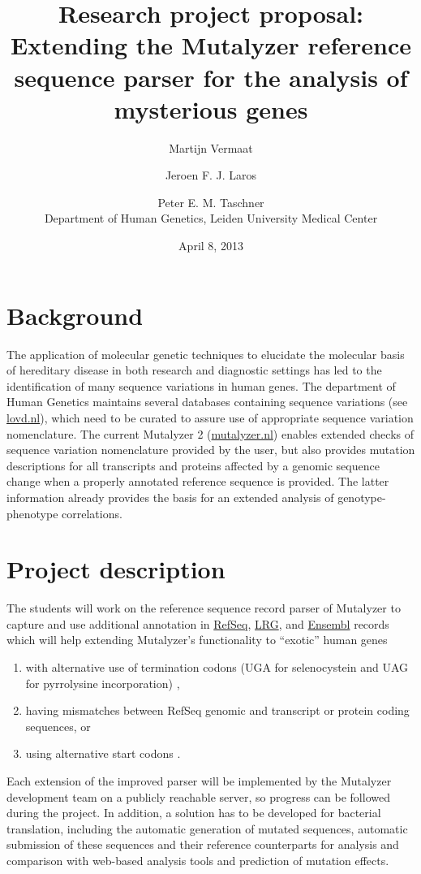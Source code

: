 \documentclass[a4paper,11pt]{article}
\title{Research project proposal: Extending the Mutalyzer reference sequence
  parser for the analysis of mysterious genes}
\date{April 8, 2013}
\author{Martijn Vermaat \and Jeroen F. J. Laros \and Peter
  E. M. Taschner\\[1.5em]
\normalsize{Department of Human Genetics, Leiden University Medical Center}}
\begin{document}
\maketitle
\thispagestyle{empty}


\section*{Background}

The application of molecular genetic techniques to elucidate the molecular
basis of hereditary disease in both research and diagnostic settings has led
to the identification of many sequence variations in human genes.
The department of Human Genetics maintains several databases containing
sequence variations (see \href{http://www.lovd.nl}{lovd.nl}), which need to be
curated to assure use of appropriate sequence variation nomenclature.
The current Mutalyzer 2 (\href{https://mutalyzer.nl}{mutalyzer.nl}) enables
extended checks of sequence variation nomenclature provided by the user, but
also provides mutation descriptions for all transcripts and proteins affected
by a genomic sequence change when a properly annotated reference sequence is
provided. The latter information already provides the basis for an extended
analysis of genotype-phenotype correlations.


\section*{Project description}

The students will work on the reference sequence record parser of Mutalyzer to
capture and use additional annotation in
\href{http://www.ncbi.nlm.nih.gov/refseq/}{RefSeq},
\href{http://www.lrg-sequence.org/}{LRG}, and
\href{http://www.ensembl.org/index.html}{Ensembl} records which will help
extending Mutalyzer's functionality to ``exotic'' human genes
\begin{enumerate}
  \itemsep0em
  \item with alternative use of termination codons (UGA for selenocystein and
    UAG for pyrrolysine incorporation) \citep{elzanowski-2010},
  \item having mismatches between RefSeq genomic and transcript or protein
    coding sequences, or
  \item using alternative start codons \citep{slavoff-2013}.
\end{enumerate}
Each extension of the improved parser will be implemented by the Mutalyzer
development team on a publicly reachable server, so progress can be followed
during the project.
In addition, a solution has to be developed for bacterial translation,
including the automatic generation of mutated sequences, automatic submission
of these sequences and their reference counterparts for analysis and
comparison with web-based analysis tools and prediction of mutation effects.
\end{document}
